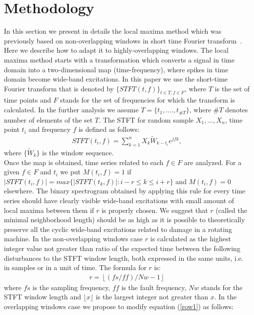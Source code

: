 \documentclass[3p,times]{elsarticle}
\begin{document}
\section{Methodology}\label{methodology}
In this section we present in details  the local maxima method which was previously based on non-overlapping windows in short time Fourier transform~\cite{bib3}. Here we describe how to adapt it to highly-overlapping windows.
The local maxima method starts with a transformation which converts a signal in time domain into a two-dimensional map (time-frequency), where spikes in time domain become wide-band excitations. In this paper we use the short-time Fourier transform that is denoted by $\{STFT(t,f)\}_{t\in T, f\in F}$, where $T$ is the set of time points and $F$ stands for the set of frequencies for which the transform is calculated. In the further analysis we assume $T=\{t_1,....,t_{\#T}\}$, where $\#T$ denotes number of elements of the set $T$. The STFT for random sample $X_1, ...,X_n$, time point $t_i$ and frequency $f$ is defined as follows:
\begin{eqnarray}
STFT(t_i,f)=\sum_{k=1}^{n}X_k\tilde{W}_{k-t_i}e^{jfk},
\end{eqnarray}
where $\{\tilde{W}_k\}$ is the window sequence.\\
Once the map is obtained, time series related to each $f\in F$ are analyzed.  For a given $f\in F$  and $t_i$ we put $M(t_i,f)=1$ if $|STFT(t_i,f)|=max\{|STFT(t_k,f)|: i-r\leq k\leq i+r\}$ and $M(t_i,f)=0$ elsewhere. The binary spectrogram obtained by applying this rule for every time series should have clearly visible wide-band excitations with small amount of local maxima between them if $r$ is properly chosen. We suggest  that $r$ (called the minimal neighborhood length) should be as high as it is possible to theoretically preserve all the cyclic wide-band excitations related to damage in a rotating machine. In the non-overlapping windows case $r$ is calculated as the highest integer value not greater than ratio of the expected time between the following disturbances to the STFT window length, both expressed in the same units, i.e. in samples or in a unit of time. The formula for $r$ is:
\begin{eqnarray}\label{row1}r=\left\lfloor (fs/ff)/Nw-1\right\rfloor
\end{eqnarray}
where $fs$ is the sampling frequency, $ff$ is the fault frequency, $Nw$ stands for the STFT window length and $\lfloor x\rfloor$ is the largest integer not greater than $x$. In the overlapping windows case we propose to modify equation (\ref{row1}) as follows:
\end{document}
